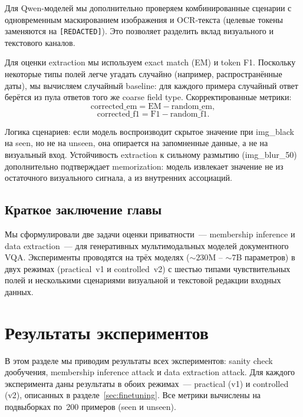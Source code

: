 \documentclass[a4paper,12pt]{extarticle}
\begin{document}
Для Qwen-моделей мы дополнительно проверяем комбинированные сценарии с одновременным маскированием изображения и OCR-текста (целевые токены заменяются на \texttt{[REDACTED]}). Это позволяет разделить вклад визуального и текстового каналов.

Для оценки extraction мы используем exact match (EM) и token F1. Поскольку некоторые типы полей легче угадать случайно (например, распространённые даты), мы вычисляем случайный baseline: для каждого примера случайный ответ берётся из пула ответов того же coarse field type. Скорректированные метрики:
\begin{equation}
\label{eq:corrected_em}
    \mathrm{corrected\_em} = \mathrm{EM} - \mathrm{random\_em},
\end{equation}
\begin{equation}
\label{eq:corrected_f1}
    \mathrm{corrected\_f1} = \mathrm{F1} - \mathrm{random\_f1}.
\end{equation}

Логика сценариев: если модель воспроизводит скрытое значение при img\_black на seen, но не на unseen, она опирается на запомненные данные, а не на визуальный вход. Устойчивость extraction к сильному размытию (img\_blur\_50) дополнительно подтверждает memorization: модель извлекает значение не из остаточного визуального сигнала, а из внутренних ассоциаций.

\subsection{Краткое заключение главы}
\label{sec:methodology_summary}

Мы сформулировали две задачи оценки приватности~--- membership inference и data extraction~--- для генеративных мультимодальных моделей документного VQA. Эксперименты проводятся на трёх моделях (${\sim}230$M -- ${\sim}7$B параметров) в двух режимах (practical~v1 и controlled~v2) с шестью типами чувствительных полей и несколькими сценариями визуальной и текстовой редакции входных данных.


\section{Результаты экспериментов}
\label{sec:results}

В этом разделе мы приводим результаты всех экспериментов: sanity check дообучения, membership inference attack и data extraction attack. Для каждого эксперимента даны результаты в обоих режимах~--- practical (v1) и controlled (v2), описанных в разделе~\ref{sec:finetuning}. Все метрики вычислены на подвыборках по~200 примеров (seen и unseen).
\end{document}
